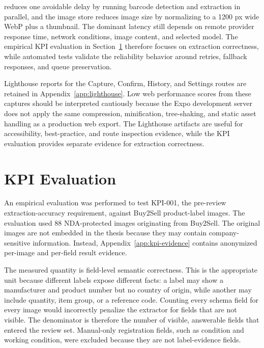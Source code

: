  reduces one avoidable delay by running barcode detection and extraction in parallel, and the image store reduces image size by normalizing to a 1200 px wide WebP plus a thumbnail. The dominant latency still depends on remote provider response time, network conditions, image content, and selected model. The empirical KPI evaluation in Section~\ref{sec:kpi-evaluation} therefore focuses on extraction correctness, while automated tests validate the reliability behavior around retries, fallback responses, and queue preservation.

Lighthouse reports for the Capture, Confirm, History, and Settings routes are retained in Appendix~\ref{app:lighthouse}. Low web performance scores from these captures should be interpreted cautiously because the Expo development server does not apply the same compression, minification, tree-shaking, and static asset handling as a production web export. The Lighthouse artifacts are useful for accessibility, best-practice, and route inspection evidence, while the KPI evaluation provides separate evidence for extraction correctness.

\section{KPI Evaluation}
\label{sec:kpi-evaluation}

An empirical evaluation was performed to test KPI-001, the pre-review extraction-accuracy requirement, against Buy2Sell product-label images. The evaluation used 88 NDA-protected images originating from Buy2Sell. The original images are not embedded in the thesis because they may contain company-sensitive information. Instead, Appendix~\ref{app:kpi-evidence} contains anonymized per-image and per-field result evidence.

The measured quantity is field-level semantic correctness. This is the appropriate unit because different labels expose different facts: a label may show a manufacturer and product number but no country of origin, while another may include quantity, item group, or a reference code. Counting every schema field for every image would incorrectly penalize the extractor for fields that are not visible. The denominator is therefore the number of visible, answerable fields that entered the review set. Manual-only registration fields, such as condition and working condition, were excluded because they are not label-evidence fields.


